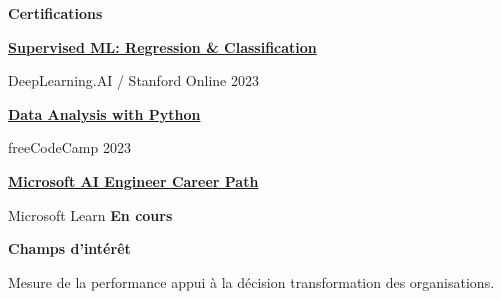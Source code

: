 \documentclass[10pt,a4paper]{article}
\newcommand{\smallsection}[2]{%
  \vspace{7pt}
  {\fontsize{8.9pt}{10.45pt}\selectfont\bfseries\color{accentdark}%
  {\scriptsize\color{accent}#1}\hspace{3.5pt}#2}\par
  \vspace{3pt}
}
\newcommand{\certitem}[2]{%
  \textbf{#1}\par
  {\fontsize{7.15pt}{8.1pt}\selectfont\color{muted}#2}\par
  \vspace{4pt}
}
\newlength{\sideboxheight}
\begin{document}
\begin{minipage}[t]{0.285\textwidth}
{\begin{minipage}[t][\sideboxheight][t]{0.91\linewidth}
  \smallsection{}{Certifications}
  \certitem{\href{https://www.coursera.org/account/accomplishments/verify/MWJS4Q3S2C3L}{Supervised ML: Regression \& Classification}}{DeepLearning.AI / Stanford Online \textbullet{} 2023}
  \certitem{\href{https://www.freecodecamp.org/certification/amiche/data-analysis-with-python-v7}{Data Analysis with Python}}{freeCodeCamp \textbullet{} 2023}
  \certitem{\href{https://learn.microsoft.com/fr-fr/training/career-paths/ai-engineer}{Microsoft AI Engineer Career Path}}{Microsoft Learn \textbullet{} \textbf{En cours}}

  \smallsection{}{Champs d'intérêt}
  {\color{muted}Mesure de la performance \textbullet{} appui à la décision \textbullet{} transformation des organisations.}\par
  \vspace{3pt}
  \end{minipage}
}

\end{minipage}
\hfill
\usebox{\maincolumnbox}
\end{document}
